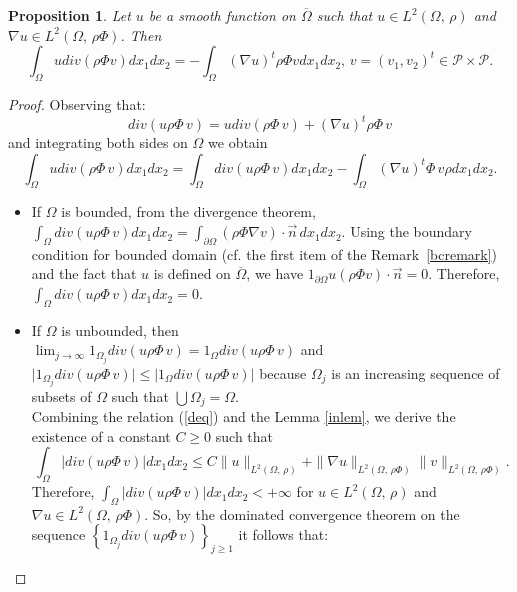 \documentclass[11pt]{article}
\newtheorem{proposition}[theorem]{Proposition}
\begin{document}
	
	
	\begin{proposition}\label{dderiv}
		Let $u$ be a smooth function on $\overline{\Omega}$ such that $u\in L^2(\Omega,\,  \rho)$ and $\nabla u\in L^2(\Omega,\,  \rho\Phi)$. Then
		\begin{equation}\label{dderiv0}
			\int_{\Omega}u div(\rho\Phi v)dx_1dx_2=-\int_{\Omega}(\nabla u)^t\rho\Phi vdx_1dx_2,\,v=(v_1,v_2)^t\in \mathcal{P}\times\mathcal{P}.
		\end{equation}
	\end{proposition}
	\begin{proof}
		Observing that: \begin{equation}\label{deq}
			div(u\rho\Phi\,v)=udiv(\rho\Phi\,v)+\left(\nabla u\right)^t\rho\Phi\,v
		\end{equation} and integrating both sides on $\Omega$ we obtain 
		\begin{equation}\label{ideq}
			\int_{\Omega}udiv(\rho\Phi\,v)dx_1dx_2=\int_{\Omega}div(u\rho\Phi\,v)dx_1dx_2-\int_{\Omega}\left(\nabla u\right)^t\Phi\,v\rho dx_1dx_2.
		\end{equation}
		\begin{itemize}
		\item 	If $\Omega$ is bounded, from the divergence theorem, $\int_{\Omega}div(u\rho\Phi\,v)dx_1dx_2= {\int_{\partial\Omega}\left(\rho\Phi\nabla v\right)\cdot\overrightarrow{n}\,dx_1dx_2 }$. Using the boundary condition for bounded domain (cf. the first item of the Remark\, \ref{bcremark})  and the fact that  $u$ is defined on $\overline{\Omega}$, we have $1_{\partial\Omega}u\left(\rho\Phi v\right)\cdot\overrightarrow{n}=0$. Therefore, $\int_{\Omega}div(u\rho\Phi\,v)dx_1dx_2=0$.
		
		\item {	If $\Omega$ is unbounded, then \\$\displaystyle{\lim_{j \to \infty }1_{\Omega_j}div(u\rho\Phi\,v)}=1_{\Omega}div(u\rho\Phi\,v)$ and $\lvert1_{\Omega_j}div(u\rho\Phi\,v)\rvert\leq \lvert 1_{\Omega}div(u\rho\Phi\,v)\rvert$ because $\Omega_j$ is an {increasing} sequence of subsets of $\Omega$ such that $\bigcup\Omega_j=\Omega$.\\
		Combining the relation (\ref{deq}) and the Lemma \ref{inlem}, we derive the existence of a constant $C\geq 0$ such that
			$$\int_{\Omega}\lvert div(u\rho\Phi\,v)\rvert dx_1dx_2 \leq C \| u\|_{L^2(\Omega,\,\rho)}+\| \nabla u\|_{L^2(\Omega,\,\rho\Phi)}\| v\|_{L^2(\Omega,\,\rho\Phi)}.$$ Therefore, $\int_{\Omega}\lvert div(u\rho\Phi\,v)\rvert dx_1dx_2<+\infty$ for $u\in L^2(\Omega,\,\rho)$ and $\nabla u\in L^2(\Omega,\,\rho\Phi)$. So, by the dominated convergence theorem on the sequence $\left\{1_{\Omega_j}div(u\rho\Phi\,v)\right\}_{j\geq 1}$ it follows that:} 
		

\end{itemize}
\end{proof}
\end{document}
